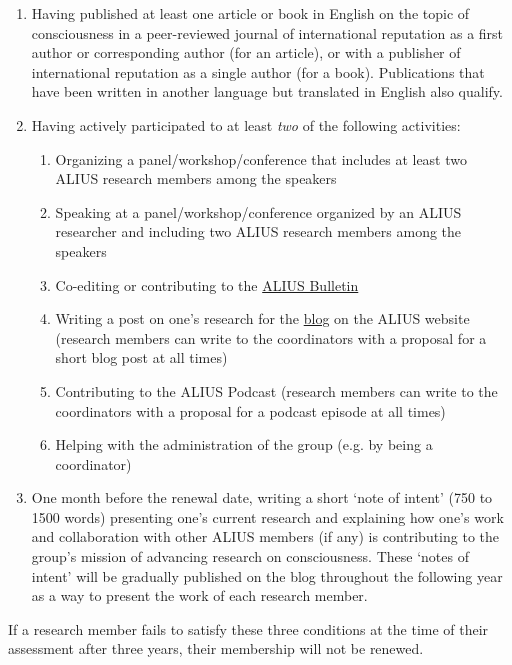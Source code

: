 \documentclass[a4paper, 11pt]{scrartcl}
\begin{document}
\begin{enumerate}

\item Having published at least one article or book in English on the topic of consciousness in a peer-reviewed journal of international reputation as a first author or corresponding author (for an article), or with a publisher of international reputation as a single author (for a book). Publications that have been written in another language but translated in English also qualify.

\item Having actively participated to at least \emph{two} of the following activities:

\begin{enumerate} 
\item Organizing a panel/workshop/conference that includes at least two ALIUS research members among the speakers
\item Speaking at a panel/workshop/conference organized by an ALIUS researcher and including two ALIUS research members among the speakers
\item Co-editing or contributing to the \href{https://www.aliusresearch.org/bulletin.html}{ALIUS Bulletin} 
\item Writing a post on one's research for the \href{https://www.aliusresearch.org/blog.html}{blog} on the ALIUS website (research members can write to the coordinators with a proposal for a short blog post at all times)
\item Contributing to the ALIUS Podcast (research members can write to the coordinators with a proposal for a podcast episode at all times)
\item Helping with the administration of the group (e.g. by being a coordinator)
\end{enumerate} 

\item One month before the renewal date, writing a short `note of intent' (750 to 1500 words) presenting one's current research and explaining how one's work and collaboration with other ALIUS members (if any) is contributing to the group's mission of advancing research on consciousness. These `notes of intent' will be gradually published on the blog throughout the following year as a way to present the work of each research member.

\end{enumerate}

If a research member fails to satisfy these three conditions at the time of their assessment after three years, their membership will not be renewed.
\end{document}
